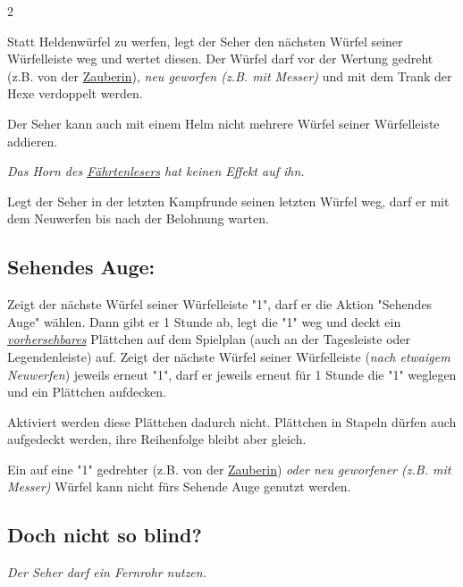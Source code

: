 \documentclass[10pt, a4paper, oneside]{book}
\newcommand{\fan}[1]{\textit{#1}}
\begin{document}
\begin{multicols*}{2}
\begin{nobgcolor}
Statt Heldenwürfel zu werfen, legt der Seher den nächsten Würfel seiner Würfelleiste weg und wertet diesen. Der Würfel darf vor der Wertung gedreht (z.B. von der \hyperref[zauberin]{Zauberin})\supercite{dh-faq}, \fan{neu geworfen (z.B. mit Messer)} und mit dem Trank der Hexe verdoppelt werden.

Der Seher kann auch mit einem Helm nicht mehrere Würfel seiner Würfelleiste addieren.
\supercite{dh-faq,dh-begleitheft}

\fan{Das Horn des \hyperref[faehrtenleser]{Fährtenlesers} hat keinen Effekt auf ihn.}

Legt der Seher in der letzten Kampfrunde seinen letzten Würfel weg, darf er mit dem Neuwerfen bis nach der Belohnung warten.
\supercite{dh-faq,dh-begleitheft}













\subsection{Sehendes Auge:}

Zeigt der nächste Würfel seiner Würfelleiste "1", darf er die Aktion "Sehendes Auge" wählen. Dann gibt er 1 Stunde ab, legt die "1" weg und deckt ein \hyperref[aufdecken]{\fan{vorhersehbares}} Plättchen auf dem Spielplan (auch an der Tagesleiste oder Legendenleiste) auf. Zeigt der nächste Würfel seiner Würfelleiste (\fan{nach etwaigem Neuwerfen}) jeweils erneut "1", darf er jeweils erneut für 1 Stunde die "1" weglegen und ein Plättchen aufdecken.\supercite{46520}

Aktiviert werden diese Plättchen dadurch nicht. Plättchen in Stapeln dürfen auch aufgedeckt werden, ihre Reihenfolge bleibt aber gleich.
\supercite{bl-bdm-a3-en}

Ein auf eine "1" gedrehter (z.B. von der \hyperref[zauberin]{Zauberin}) \fan{oder neu geworfener (z.B. mit Messer)} Würfel kann nicht fürs Sehende Auge genutzt werden.
\supercite{dh-faq}



\subsection{Doch nicht so blind?}

\fan{Der Seher darf ein Fernrohr nutzen.}



\end{nobgcolor}
\end{multicols*}
\end{document}
